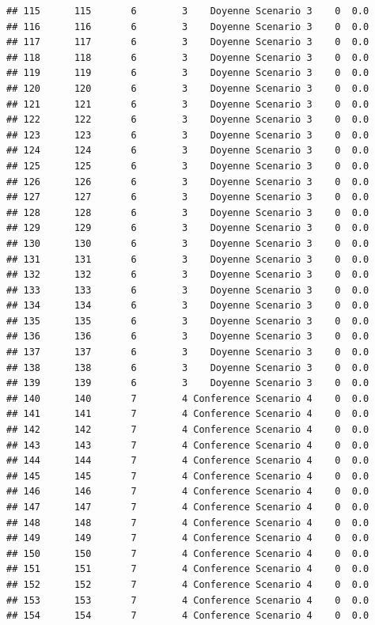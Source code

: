 \documentclass[
]{article}
\begin{document}
\begin{verbatim}
## 115      115       6        3    Doyenne Scenario 3    0  0.0
## 116      116       6        3    Doyenne Scenario 3    0  0.0
## 117      117       6        3    Doyenne Scenario 3    0  0.0
## 118      118       6        3    Doyenne Scenario 3    0  0.0
## 119      119       6        3    Doyenne Scenario 3    0  0.0
## 120      120       6        3    Doyenne Scenario 3    0  0.0
## 121      121       6        3    Doyenne Scenario 3    0  0.0
## 122      122       6        3    Doyenne Scenario 3    0  0.0
## 123      123       6        3    Doyenne Scenario 3    0  0.0
## 124      124       6        3    Doyenne Scenario 3    0  0.0
## 125      125       6        3    Doyenne Scenario 3    0  0.0
## 126      126       6        3    Doyenne Scenario 3    0  0.0
## 127      127       6        3    Doyenne Scenario 3    0  0.0
## 128      128       6        3    Doyenne Scenario 3    0  0.0
## 129      129       6        3    Doyenne Scenario 3    0  0.0
## 130      130       6        3    Doyenne Scenario 3    0  0.0
## 131      131       6        3    Doyenne Scenario 3    0  0.0
## 132      132       6        3    Doyenne Scenario 3    0  0.0
## 133      133       6        3    Doyenne Scenario 3    0  0.0
## 134      134       6        3    Doyenne Scenario 3    0  0.0
## 135      135       6        3    Doyenne Scenario 3    0  0.0
## 136      136       6        3    Doyenne Scenario 3    0  0.0
## 137      137       6        3    Doyenne Scenario 3    0  0.0
## 138      138       6        3    Doyenne Scenario 3    0  0.0
## 139      139       6        3    Doyenne Scenario 3    0  0.0
## 140      140       7        4 Conference Scenario 4    0  0.0
## 141      141       7        4 Conference Scenario 4    0  0.0
## 142      142       7        4 Conference Scenario 4    0  0.0
## 143      143       7        4 Conference Scenario 4    0  0.0
## 144      144       7        4 Conference Scenario 4    0  0.0
## 145      145       7        4 Conference Scenario 4    0  0.0
## 146      146       7        4 Conference Scenario 4    0  0.0
## 147      147       7        4 Conference Scenario 4    0  0.0
## 148      148       7        4 Conference Scenario 4    0  0.0
## 149      149       7        4 Conference Scenario 4    0  0.0
## 150      150       7        4 Conference Scenario 4    0  0.0
## 151      151       7        4 Conference Scenario 4    0  0.0
## 152      152       7        4 Conference Scenario 4    0  0.0
## 153      153       7        4 Conference Scenario 4    0  0.0
## 154      154       7        4 Conference Scenario 4    0  0.0

\end{verbatim}
\end{document}
